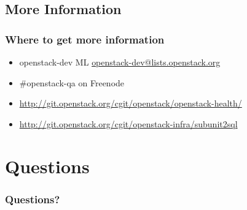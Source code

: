\documentclass[aspectratio=169,11pt,hyperref={colorlinks=true}]{beamer}
\begin{document}
\subsection{More Information}
\begin{frame}
\frametitle{Where to get more information}
    \begin{itemize}
        \item openstack-dev ML\: \href{mailto:openstack-dev@lists.openstack.org}{openstack-dev@lists.openstack.org}
        \item \#openstack-qa on Freenode
        \item \href{http://git.openstack.org/cgit/openstack/openstack-health/}{http://git.openstack.org/cgit/openstack/openstack-health/}
        \item \href{http://git.openstack.org/cgit/openstack-infra/subunit2sql}{http://git.openstack.org/cgit/openstack-infra/subunit2sql}
    \end{itemize}
\end{frame}

\section{Questions}
\begin{frame}
\frametitle{Questions?}
\end{frame}
\end{document}
